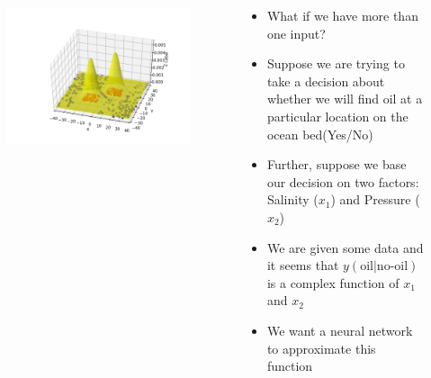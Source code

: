 \begin{frame}
	\begin{columns}
		\begin{overlayarea}{\textwidth}{\textheight}
			\begin{figure}
				\includegraphics[scale=0.35]{images/module5/Plots/g2.png}
			\end{figure}
		\end{overlayarea}
		\begin{overlayarea}{\textwidth}{\textheight}
			\begin{itemize}
			\item <1-> What if we have more than one input?
			\item<2-> Suppose we are trying to take a decision about whether we will find oil at a particular location on the ocean bed(Yes/No)
			\item<3-> Further, suppose we base our decision on two factors: Salinity ($x_1$) and Pressure ($x_2$)
			\item<4-> We are given some data and it seems that $y(\text{oil}|\text{no-oil})$ is a complex function of $x_1$ and $x_2$
			\item<5-> We want a neural network to approximate this function
			\end{itemize}
		\end{overlayarea}
	\end{columns}
\end{frame}

